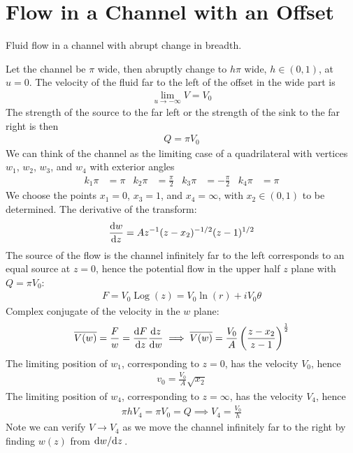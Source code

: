 \documentclass[12pt, english]{book}
\DeclareMathOperator\Log{Log}
\begin{document}
	\section{Flow in a Channel with an Offset} \label{Flow in a Channel with an Offset Section - Complex}
	
	Fluid flow in a channel with abrupt change in breadth. 
	
	Let the channel be \(\pi\) wide, then abruptly change to \(h\pi\) wide, \(h \in (0, 1)\), at \(u = 0\). The velocity of the fluid far to the left of the offset in the wide part is 
	\begin{align*}
		\lim_{u \rightarrow -\infty} V = V_0
	\end{align*}
	The strength of the source to the far left or the strength of the sink to the far right is then 
	\begin{align*}
		Q = \pi V_0
	\end{align*}
	We can think of the channel as the limiting case of a quadrilateral with vertices \(w_1\), \(w_2\), \(w_3\), and \(w_4\) with exterior angles
	\begin{align*}
		k_1 \pi &= \pi &
		k_2 \pi &= \frac{\pi}{2} &
		k_3 \pi &= -\frac{\pi}{2} &
		k_4 \pi &= \pi
	\end{align*}
	We choose the points \(x_1 = 0\), \(x_3 = 1\), and \(x_4 = \infty\), with \(x_2 \in (0, 1)\) to be determined. The derivative of the transform:
	\begin{align*}
		\dv{w}{z} = Az^{-1} (z - x_2)^{-1/2} (z-1)^{1/2}
	\end{align*}
	The source of the flow is the channel infinitely far to the left corresponds to an equal source at \(z=0\), hence the potential flow in the upper half \(z\) plane with \(Q = \pi V_0\):
	\begin{align*}
		F = V_0 \Log(z) = V_0 \ln(r) + iV_0 \theta
	\end{align*}
	Complex conjugate of the velocity in the \(w\) plane:
	\begin{align*}
		\overline{V(w)} = \frac{F}{w} = \dv{F}{z} \dv{z}{w}
		\implies \overline{V(w)} = \frac{V_0}{A} \left(\frac{z - x_2}{z - 1}\right)^\frac{1}{2}
	\end{align*}
	The limiting position of \(w_1\), corresponding to \(z = 0\), has the velocity \(V_0\), hence
	\begin{align*}
		v_0 = \frac{V_0}{A} \sqrt{x_2}
	\end{align*}
	The limiting position of \(w_4\), corresponding to \(z = \infty\), has the velocity \(V_4\), hence
	\begin{align*}
		\pi h V_4 = \pi V_0 = Q \implies V_4 = \frac{V_0}{h}
	\end{align*}
	Note we can verify \(V \rightarrow V_4\) as we move the channel infinitely far to the right by finding \(w(z)\) from \(\dv*{w}{z}\).
	
\end{document}
